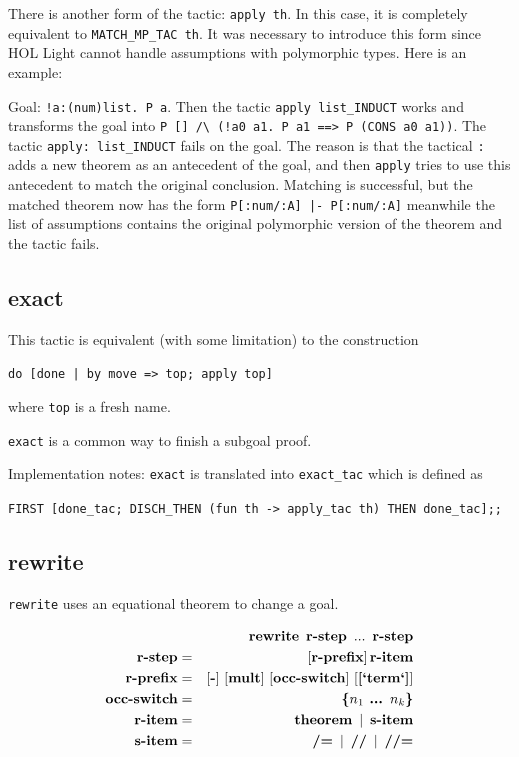 \documentclass[a4paper]{article}
\newcommand{\xx}[1]{\mathop{\text{\bf #1}}}
\begin{document}
There is another form of the tactic: \verb|apply th|. In this case, it is completely equivalent to \verb|MATCH_MP_TAC th|. It was necessary to introduce this form since HOL Light cannot handle assumptions with polymorphic types. Here is an example:

Goal: \verb|!a:(num)list. P a|. Then the tactic \verb|apply list_INDUCT| works and transforms the goal into \verb|P [] /\ (!a0 a1. P a1 ==> P (CONS a0 a1))|. The tactic \verb|apply: list_INDUCT| fails on the goal. The reason is that the tactical \verb|:| adds a new theorem as an antecedent of the goal, and then \verb|apply| tries to use this antecedent to match the original conclusion. Matching is successful, but the matched theorem now has the form \verb$P[:num/:A] |- P[:num/:A]$ meanwhile the list of assumptions contains the original polymorphic version of the theorem and the tactic fails.


\subsection{exact}
This tactic is equivalent (with some limitation) to the construction 

\verb$do [done | by move => top; apply top]$ 

where \verb|top| is a fresh name.

\verb|exact| is a common way to finish a subgoal proof.

Implementation notes: \verb|exact| is translated into \verb|exact_tac| which is defined as

\verb|FIRST [done_tac; DISCH_THEN (fun th -> apply_tac th) THEN done_tac];;|


\subsection{rewrite}
\verb|rewrite| uses an equational theorem to change a goal.

\begin{eqnarray*}
&&\xx{rewrite}\ \xx{r-step}\ ...\ \xx{r-step}\\
\xx{r-step} &=& [\xx{r-prefix}]\xx{r-item}\\
\xx{r-prefix} &=& [\xx{-}]\ [\xx{mult}]\ [\xx{occ-switch}]\ [\xx{[`term`]}]\\
\xx{occ-switch} &=& \xx{\{$n_1$ ... $n_k$\}}\\
\xx{r-item} &=& \xx{theorem}\ |\ \xx{s-item}\\
\xx{s-item} &=& \xx{/=}\ |\ \xx{//}\ |\ \xx{//=}
\end{eqnarray*}
\end{document}
